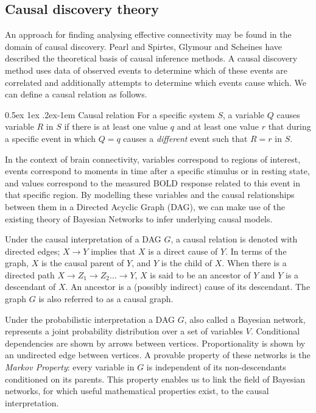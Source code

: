 \documentclass[a4paper, 10pt, english, onecolumn]{article}
\makeatletter
\renewcommand{\paragraph}{%
  \@startsection{paragraph}{4}%
  {\z@}{0.5ex \@plus 1ex \@minus .2ex}{-1em}%
  {\normalfont\normalsize\bfseries}%
}
\makeatother
\begin{document}
\subsection{Causal discovery theory}
An approach for finding analysing effective connectivity may be found in the domain of causal discovery.
Pearl\cite{pearl2000causality} and Spirtes, Glymour and Scheines\cite{spirtes2000} have described the theoretical basis of causal inference methods.
A causal discovery method uses data of observed events to determine which of these events are correlated and additionally attempts to determine which events cause which.
We can define a causal relation as follows.

\paragraph{Causal relation}
For a specific system $S$, a variable $Q$ causes variable $R$ in $S$ if there is at least one value $q$ and at least one value $r$ that during a specific event in which $Q=q$ causes a \textit{different} event such that $R = r$ in $S$\cite[p.21]{spirtes2000}.

In the context of brain connectivity, variables correspond to regions of interest, events correspond to moments in time after a specific stimulus or in resting state, and values correspond to the measured BOLD response related to this event in that specific region.
By modelling these variables and the causal relationships between them in a Directed Acyclic Graph (DAG), we can make use of the existing theory of Bayesian Networks to infer underlying causal models.

Under the causal interpretation of a DAG $G$, a causal relation is denoted with directed edges; $X \rightarrow Y$ implies that $X$ is a direct cause of $Y$.
In terms of the graph, $X$ is the causal parent of $Y$, and $Y$ is the child of $X$. 
When there is a directed path $X \rightarrow Z_1 \rightarrow Z_2 \dots \rightarrow Y$, $X$ is said to be an ancestor of $Y$ and $Y$ is a descendant of $X$.
An ancestor is a (possibly indirect) cause of its descendant.
The graph $G$ is also referred to as a causal graph.

Under the probabilistic interpretation a DAG $G$, also called a Bayesian network, represents a joint probability distribution over a set of variables $V$.
Conditional dependencies are shown by arrows between vertices.
Proportionality is shown by an undirected edge between vertices.
A provable property of these networks is the \textit{Markov Property}: every variable in $G$ is independent of its non-descendants conditioned on its parents.
This property enables us to link the field of Bayesian networks, for which useful mathematical properties exist, to the causal interpretation.
\end{document}

